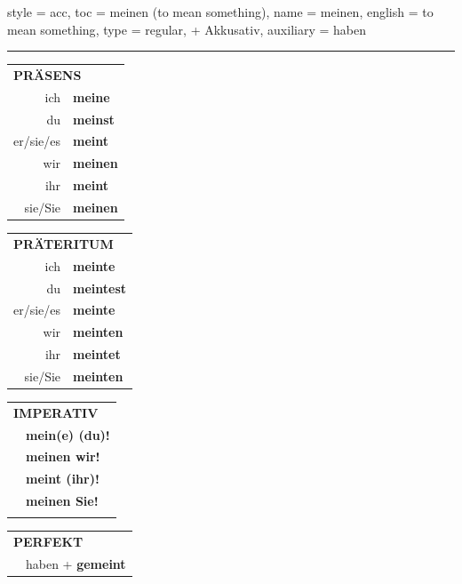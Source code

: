 \begin{verbentry}{
  style = {acc},
  toc = {meinen (to mean something)},
  name = {meinen},
  english = {to mean something},
  type = {regular, + Akkusativ},
  auxiliary = {haben}
}
 
    
     \vspace{5pt}

    \hrule
    
    \vspace{5pt}

  \begin{tabular}{rl}
     \multicolumn{2}{l}{\textbf{PRÄSENS} }\\
    ich & \textbf{meine}\\
    du & \textbf{meinst}\\
    er/sie/es & \textbf{meint}\\
    wir & \textbf{meinen}\\
    ihr & \textbf{meint}\\
    sie/Sie & \textbf{meinen}\\
  \end{tabular}
  \hfill
     \begin{tabular}{rl}
    \multicolumn{2}{l}{\textbf{PRÄTERITUM} }\\
    ich & \textbf{meinte}\\
    du & \textbf{meintest}\\
    er/sie/es & \textbf{meinte}\\
    wir & \textbf{meinten}\\
    ihr & \textbf{meintet}\\
    sie/Sie & \textbf{meinten}\\
  \end{tabular}
  \hfill
  \begin{tabular}{rl}
     \multicolumn{2}{l}{\textbf{IMPERATIV} }\\
   & \textbf{mein(e) (du)!}\\
   & \textbf{meinen wir!}\\
   & \textbf{meint (ihr)!}\\
   & \textbf{meinen Sie!}\\
   & \vspace{10pt}
  \end{tabular}

    \vspace{10pt}

 \begin{tabular}{rl}
     \multicolumn{2}{l}{\textbf{PERFEKT}}\\
  &  haben + \textbf{gemeint}\\
  \end{tabular}
\hfill
   \begin{tabular}{rl}
   

\end{tabular}
\end{verbentry}
